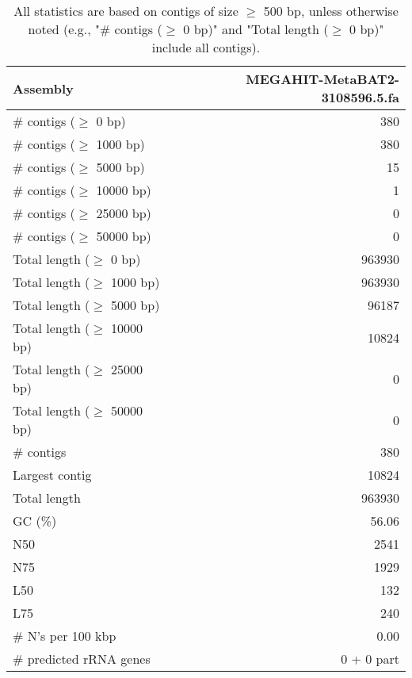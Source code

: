 \documentclass[12pt,a4paper]{article}
\begin{document}
\begin{table}[ht]
\begin{center}
\caption{All statistics are based on contigs of size $\geq$ 500 bp, unless otherwise noted (e.g., "\# contigs ($\geq$ 0 bp)" and "Total length ($\geq$ 0 bp)" include all contigs).}
\begin{tabular}{|l*{1}{|r}|}
\hline
Assembly & MEGAHIT-MetaBAT2-3108596.5.fa \\ \hline
\# contigs ($\geq$ 0 bp) & 380 \\ \hline
\# contigs ($\geq$ 1000 bp) & 380 \\ \hline
\# contigs ($\geq$ 5000 bp) & 15 \\ \hline
\# contigs ($\geq$ 10000 bp) & 1 \\ \hline
\# contigs ($\geq$ 25000 bp) & 0 \\ \hline
\# contigs ($\geq$ 50000 bp) & 0 \\ \hline
Total length ($\geq$ 0 bp) & 963930 \\ \hline
Total length ($\geq$ 1000 bp) & 963930 \\ \hline
Total length ($\geq$ 5000 bp) & 96187 \\ \hline
Total length ($\geq$ 10000 bp) & 10824 \\ \hline
Total length ($\geq$ 25000 bp) & 0 \\ \hline
Total length ($\geq$ 50000 bp) & 0 \\ \hline
\# contigs & 380 \\ \hline
Largest contig & 10824 \\ \hline
Total length & 963930 \\ \hline
GC (\%) & 56.06 \\ \hline
N50 & 2541 \\ \hline
N75 & 1929 \\ \hline
L50 & 132 \\ \hline
L75 & 240 \\ \hline
\# N's per 100 kbp & 0.00 \\ \hline
\# predicted rRNA genes & 0 + 0 part \\ \hline
\end{tabular}
\end{center}
\end{table}
\end{document}
